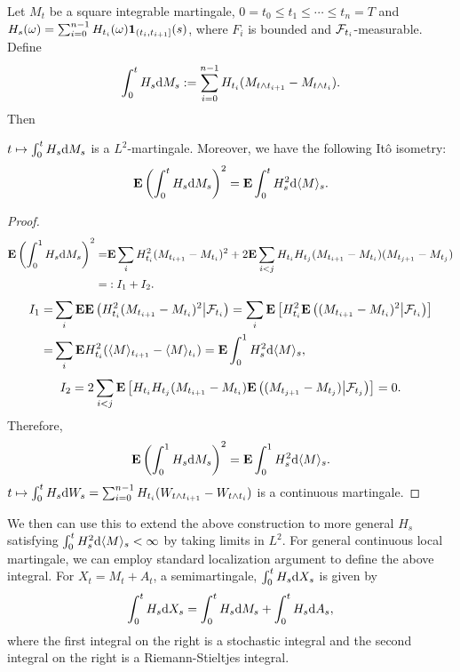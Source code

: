 	Let $M_t$ be a square integrable martingale, $0=t_0\leq t_1\leq \cdots \leq t_{n}=T$ and $H_s(\omega) = \sum_{i=0}^{n-1} H_{t_i}(\omega){\mathbf{1}}_{(t_{i},t_{i+1}]}(s)$, where $F_i$ is bounded and ${\mathcal F}_{t_i}$-measurable. Define 
	\[
	\int_0^t H_s \text{\rm{d}} M_s:= \sum_{i=0}^{n-1} H_{t_i} (M_{t\wedge t_{i+1}}-M_{t\wedge t_{i}}). 
	\]
	Then 
	\begin{lemma}
		$t\mapsto \int_0^t H_s \text{\rm{d}} M_s$ is a $L^2$-martingale. Moreover, we have the following It\^o isometry:  
		\begin{equation}
			{\mathbf E} \left(\int_0^t H_s \text{\rm{d}} M_s \right)^2 = {\mathbf E} \int_0^t H_s^2 \text{\rm{d}} \langle M\rangle_s. 
		\end{equation}
	\end{lemma}
	\begin{proof}
		\begin{align*}
			{\mathbf E} \left(\int_0^1 H_s \text{\rm{d}} M_s\right)^2=& {\mathbf E} \sum_{i} H_{t_i}^2 (M_{t_{i+1}}-M_{t_i})^2 + 2{\mathbf E} \sum_{i<j} H_{t_i}H_{t_j}(M_{t_{i+1}}-M_{t_i})(M_{t_{j+1}}-M_{t_j}) \\
			=&: I_1+ I_2. 
		\end{align*}
		\begin{align*}
			\begin{aligned}
				I_1=&\sum_{i} {\mathbf E} {\mathbf E} \left(H_{t_i}^2 (M_{t_{i+1}}-M_{t_i})^2\big|{\mathcal F}_{t_i}\right)= \sum_{i} {\mathbf E} \left[ H_{t_i}^2 {\mathbf E}\left( (M_{t_{i+1}}-M_{t_i})^2\big|{\mathcal F}_{t_i}\right) \right] \\
				=&\sum_{i}  {\mathbf E} H_{t_i}^2 (\langle M\rangle_{t_{i+1}}-\langle M\rangle_{t_{i}})= {\mathbf E}  \int_0^1 H^2_s \text{\rm{d}} \langle M\rangle_s ,
			\end{aligned}
		\end{align*}
		\begin{align*}
			I_2= 2\sum_{i<j} {\mathbf E} \left[  H_{t_i}H_{t_j}(M_{t_{i+1}}-M_{t_i}) {\mathbf E} \left( (M_{t_{j+1}}-M_{t_j}) \big|{\mathcal F}_{t_j}\right) \right]=0. 
		\end{align*}
		Therefore, 
		\begin{equation*}
			{\mathbf E} \left(\int_0^1 H_s \text{\rm{d}} M_s\right)^2=  {\mathbf E}  \int_0^1 H^2_s \text{\rm{d}} \langle M\rangle_s. 
		\end{equation*}
		$t\mapsto \int_0^t H_s \text{\rm{d}} W_s=  \sum_{i=0}^{n-1} H_{t_i}(W_{t\wedge t_{i+1}}-W_{t\wedge t_i})$ is a continuous martingale. 
	\end{proof}
	
	We then can use this to extend the above construction to more general $H_s$ satisfying $\int_0^t H_s^2 \text{\rm{d}} \langle M \rangle_s<\infty$ by taking limits in $L^2$. For general continuous local martingale, we can employ standard localization argument to define the above integral. For $X_t=M_t+A_t$, a semimartingale, $\int_0^t H_s \text{\rm{d}} X_s$ is given by
	$$
	\int_0^t H_s \text{\rm{d}} X_s=\int_0^t H_s \text{\rm{d}} M_s+\int_0^t H_s \text{\rm{d}} A_s, 
	$$
	where the first integral on the right is a stochastic integral and the second integral on the right is a Riemann-Stieltjes integral.
	
